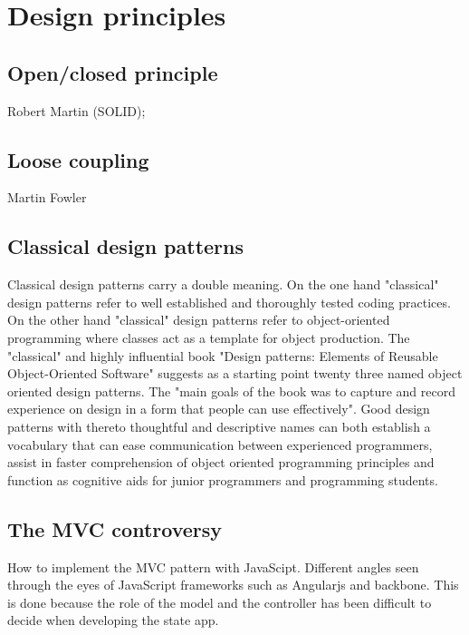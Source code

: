 \documentclass[english]{ifimaster}
\begin{document}
\section{Design principles}
\subsection{Open/closed principle}
Robert Martin (SOLID);
\subsection {Loose coupling}
Martin Fowler

\subsection{Classical design patterns}
Classical design patterns carry a double meaning. On the one hand "classical" design patterns refer to well established and thoroughly tested coding practices\parencite[p. 12]{gamma}. On the other hand "classical" design patterns refer to object-oriented programming where classes act as a template for object production\parencite[p. 115]{stefanov}. The "classical" and highly influential book "Design patterns: Elements of Reusable Object-Oriented Software" suggests as a starting point twenty three named object oriented design patterns. The "main goals of the book was to capture and record experience on design in a form that people can use effectively"\parencite[p. 12]{gamma}. Good design patterns with thereto thoughtful and descriptive names can both establish a vocabulary that can ease communication between experienced programmers, assist in faster comprehension of object oriented programming principles and function as cognitive aids for junior programmers and programming students.


\subsection{The MVC controversy}
How to implement the MVC pattern with JavaScipt. Different angles seen through the eyes of JavaScript frameworks such as Angularjs and backbone. This is done because the role of the model and the controller has been difficult to decide when developing the state app.
\end{document}
